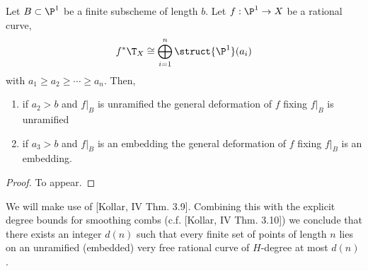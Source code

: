 \documentclass[12pt]{article}
\begin{document}
\begin{lemma}
Let $B \subset \P^1$ be a finite subscheme of length $b$. Let $f : \P^1 \to X$ be a rational curve,
\[ f^* \T_X \cong \bigoplus_{i = 1}^n \struct{\P^1}(a_i) \]
with $a_1 \ge a_2 \ge \cdots \ge a_n$. Then,
\begin{enumerate}
\item if $a_2 > b$ and $f|_B$ is unramified the general deformation of $f$ fixing $f|_B$ is unramified

\item if $a_3 > b$ and $f|_B$ is an embedding the general deformation of $f$ fixing $f|_B$ is an embedding.
\end{enumerate}
\end{lemma}

\begin{proof}
To appear.
\iffalse
For part (a) it suffices to deform $f$ along a tangent field $H^0(\P^1, f^* \T_X \ot \I_B)$ which vanishes nowhere except on $B$. Since $a_2 > b$ thus $f^* \T_X \ot \I_B$ contains two copies of $\struct{\P^1}(a_i)$ with $a_i > 0$. (WHY DONT GET IT WITH JUST $a_1 \ge b$ SINCE THEN HAVE A FREE PARAMETER AND MAKE IT VANISH COMPLETELY ALONG $B$) (WHAT ABOUT OBSTRUCTIONS)

By part (a) we can deform $f$ such that it is unramified. Then factoring $f : \P^1 \to \P^1 \to C$ through the normalization we must have the first map be an isomorphism or else by Riemann-Hurwitz it would have ramification. Thus $f$ is an immersion with finitely many ordinary multiple points. We need to deform $f$ along a tangent field $H^0(\P^1, f^* \T_X \ot \I_B)$ which separates the branches at these multiple points.  
\fi
\end{proof}

\begin{rmk}
We will make use of [Kollar, IV Thm. 3.9]. Combining this with the explicit degree bounds for smoothing combs (c.f. [Kollar, IV Thm. 3.10]) we conclude that there exists an integer $d(n)$ such that every finite set of points of length $n$ lies on an unramified (embedded) very free rational curve of $H$-degree at most $d(n)$.
\end{rmk}
\end{document}
